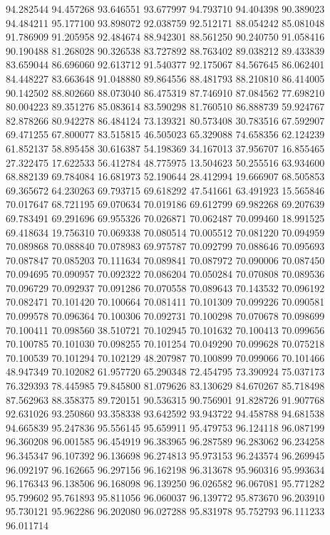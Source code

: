 94.282544
94.457268
93.646551
93.677997
94.793710
94.404398
90.389023
94.484211
95.177100
93.898072
92.038759
92.512171
88.054242
85.081048
91.786909
91.205958
92.484674
88.942301
88.561250
90.240750
91.058416
90.190488
81.268028
90.326538
83.727892
88.763402
89.038212
89.433839
83.659044
86.696060
92.613712
91.540377
92.175067
84.567645
86.062401
84.448227
83.663648
91.048880
89.864556
88.481793
88.210810
86.414005
90.142502
88.802660
88.073040
86.475319
87.746910
87.084562
77.698210
80.004223
89.351276
85.083614
83.590298
81.760510
86.888739
59.924767
82.878266
80.942278
86.484124
73.139321
80.573408
30.783516
67.592907
69.471255
67.800077
83.515815
46.505023
65.329088
74.658356
62.124239
61.852137
58.895458
30.616387
54.198369
34.167013
37.956707
16.855465
27.322475
17.622533
56.412784
48.775975
13.504623
50.255516
63.934600
68.882139
69.784084
16.681973
52.190644
28.412994
19.666907
68.505853
69.365672
64.230263
69.793715
69.618292
47.541661
63.491923
15.565846
70.017647
68.721195
69.070634
70.019186
69.612799
69.982268
69.207639
69.783491
69.291696
69.955326
70.026871
70.062487
70.099460
18.991525
69.418634
19.756310
70.069338
70.080514
70.005512
70.081220
70.094959
70.089868
70.088840
70.078983
69.975787
70.092799
70.088646
70.095693
70.087847
70.085203
70.111634
70.089841
70.087972
70.090006
70.087450
70.094695
70.090957
70.092322
70.086204
70.050284
70.070808
70.089536
70.096729
70.092937
70.091286
70.070558
70.089643
70.143532
70.096192
70.082471
70.101420
70.100664
70.081411
70.101309
70.099226
70.090581
70.099578
70.096364
70.100306
70.092731
70.100298
70.070678
70.098699
70.100411
70.098560
38.510721
70.102945
70.101632
70.100413
70.099656
70.100785
70.101030
70.098255
70.101254
70.049290
70.099628
70.075218
70.100539
70.101294
70.102129
48.207987
70.100899
70.099066
70.101466
48.947349
70.102082
61.957720
65.290348
72.454795
73.390924
75.037173
76.329393
78.445985
79.845800
81.079626
83.130629
84.670267
85.718498
87.562963
88.358375
89.720151
90.536315
90.756901
91.828726
91.907768
92.631026
93.250860
93.358338
93.642592
93.943722
94.458788
94.681538
94.665839
95.247836
95.556145
95.659911
95.479753
96.124118
96.087199
96.360208
96.001585
96.454919
96.383965
96.287589
96.283062
96.234258
96.345347
96.107392
96.136698
96.274813
95.973153
96.243574
96.269945
96.092197
96.162665
96.297156
96.162198
96.313678
95.960316
95.993634
96.176343
96.138506
96.168098
96.139250
96.026582
96.067081
95.771282
95.799602
95.761893
95.811056
96.060037
96.139772
95.873670
96.203910
95.730121
95.962286
96.202080
96.027288
95.831978
95.752793
96.111233
96.011714
